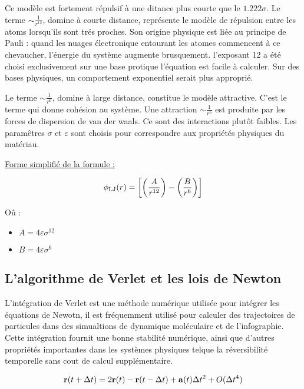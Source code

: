 Ce modèle est fortement répulsif à une ditance plus courte que le $1.222 \sigma$.
Le terme  $\sim \frac{1}{r^{12}}$, domine à courte distance, représente le modèle de répulsion entre les atoms lorsqu'ils sont trés proches. Son origine physique est liée au principe de Pauli :  quand les nuages électronique entourant les atomes commencent à ce chevaucher, l'énergie du système augmente brusquement. l'exposant 12 a été choisi exclusivement sur une base protique l'équation est facile à calculer. Sur des bases physiques, un comportement exponentiel serait plus approprié.

Le terme   $\sim \frac{1}{r^{6}}$, domine à large distance, constitue le modèle attractive. C'est le terme qui donne cohésion au système. Une attraction  $\sim \frac{1}{r^{6}}$ est produite par les forces de dispersion de van der waals. Ce sont des interactions plutôt faibles.
Les paramêtres $\sigma$ et $\varepsilon$ sont choisis pour correspondre aux propriétés physiques du matériau.

\underline{Forme simplifié de la formule :}


 \begin{displaymath}
 \phi_{\rm LJ} (r) =  \left[ \left(\frac{A}{r^{12}}\right) - \left(\frac{B}{r^{6}}\right) \right]\end{displaymath}

Oû :
\begin{itemize}
    \item $ A = 4 \varepsilon \sigma ^{12}$
    \item $ B = 4 \varepsilon \sigma ^{6}$
\end{itemize}

\subsection{L'algorithme de Verlet et les lois de Newton}

L'intégration de Verlet est une méthode numérique utilisée pour intégrer les équations de Newotn, il est fréquemment utilisé pour calculer des trajectoires de particules dans des simualtions de dynamique moléculaire et de l'infographie.
Cette intégration fournit une bonne stabilité numérique, ainsi que d'autres propriétés importantes dans les systèmes physiques telque la réversibilité temporelle sans cout de calcul supplémentaire.

\begin{displaymath} {\bf r} (t+\Delta t) = 2{\bf r} (t) - {\bf r} (t-\Delta t) + {\bf a} (t) \Delta t^2 + O(\Delta t^4) \end{displaymath}

